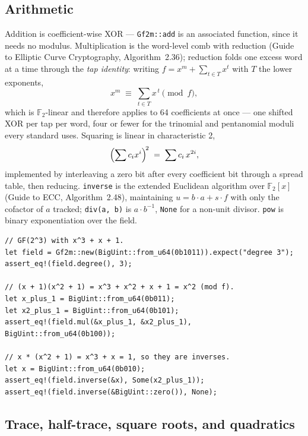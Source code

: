 \documentclass[11pt]{article}
\newcommand{\code}[1]{\texttt{#1}}
\newcommand{\F}{\mathbb{F}}
\begin{document}
\subsection{Arithmetic}

Addition is coefficient-wise XOR --- \code{Gf2m::add} is an associated
function, since it needs no modulus. Multiplication is the word-level comb
with reduction (Guide to Elliptic Curve Cryptography, Algorithm~2.36);
reduction folds one excess word at a time through the \emph{tap identity}:
writing $f = x^m + \sum_{t \in T} x^t$ with $T$ the lower exponents,
\begin{equation}
x^m \;\equiv\; \sum_{t \in T} x^{\,t} \pmod{f},
\end{equation}
which is $\F_2$-linear and therefore applies to 64 coefficients at once ---
one shifted XOR per tap per word, four or fewer for the trinomial and
pentanomial moduli every standard uses. Squaring is linear in
characteristic 2,
\begin{equation}
\Bigl(\sum c_i x^i\Bigr)^{\!2} \;=\; \sum c_i\, x^{2i},
\end{equation}
implemented by interleaving a zero bit after every coefficient bit through
a spread table, then reducing. \code{inverse} is the extended Euclidean
algorithm over $\F_2[x]$ (Guide to ECC, Algorithm~2.48), maintaining
$u = b \cdot a + s \cdot f$ with only the cofactor of $a$ tracked;
\code{div(a, b)} is $a \cdot b^{-1}$, \code{None} for a non-unit divisor.
\code{pow} is binary exponentiation over the field.

\begin{lstlisting}
// GF(2^3) with x^3 + x + 1.
let field = Gf2m::new(BigUint::from_u64(0b1011)).expect("degree 3");
assert_eq!(field.degree(), 3);

// (x + 1)(x^2 + 1) = x^3 + x^2 + x + 1 = x^2 (mod f).
let x_plus_1 = BigUint::from_u64(0b011);
let x2_plus_1 = BigUint::from_u64(0b101);
assert_eq!(field.mul(&x_plus_1, &x2_plus_1), BigUint::from_u64(0b100));

// x * (x^2 + 1) = x^3 + x = 1, so they are inverses.
let x = BigUint::from_u64(0b010);
assert_eq!(field.inverse(&x), Some(x2_plus_1));
assert_eq!(field.inverse(&BigUint::zero()), None);
\end{lstlisting}

\subsection{Trace, half-trace, square roots, and quadratics}
\end{document}
